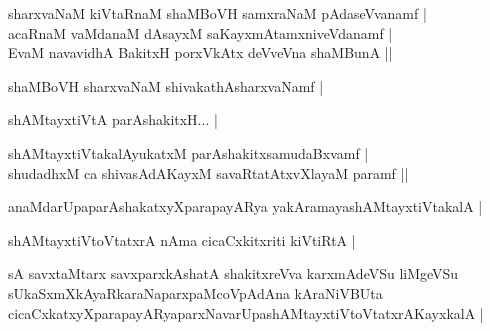 \begin{entry}
\begin{shl}
sharxvaNaM kiVtaRnaM shaMBoVH samxraNaM pAdaseVvanamf |\\
acaRnaM vaMdanaM dAsayxM saKayxmAtamxniveVdanamf |\\
EvaM navavidhA BakitxH porxVkAtx deVveVna shaMBunA ||
\end{shl}
\begin{shl}
shaMBoVH sharxvaNaM shivakathAsharxvaNamf |
\end{shl}
\end{entry}

\begin{entry}
\end{entry}

\begin{entry}
\begin{shl}
shAMtayxtiVtA parAshakitxH... |
\end{shl}
\begin{shl}
shAMtayxtiVtakalAyukatxM parAshakitxsamudaBxvamf |\\
shudadhxM ca shivasAdAKayxM savaRtatAtxvXlayaM paramf ||
\end{shl}
\begin{shl}
anaMdarUpaparAshakatxyXparapayARya yakAramayashAMtayxtiVtakalA |
\end{shl}
\end{entry}

\begin{entry}
\begin{shl}
shAMtayxtiVtoVtatxrA nAma cicaCxkitxriti kiVtiRtA |
\end{shl}
\begin{shl}
sA savxtaMtarx savxparxkAshatA shakitxreVva karxmAdeVSu liMgeVSu sUkaSxmXkAyaRkaraNaparxpaMcoVpAdAna kAraNiVBUta cicaCxkatxyXparapayARyaparxNavarUpashAMtayxtiVtoVtatxrAKayxkalA |
\end{shl}
\end{entry}

